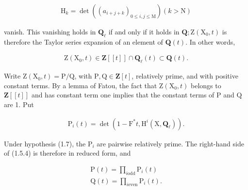 \documentclass[10pt,leqno]{article}
\begin{document}
\begin{equation*}\begin{gathered}\mathrm{H}_{k} = \operatorname{det}((a_{i+j+k})_{0\leq i,j\leq \mathrm{M}})    (k>\mathrm{N})\end{gathered}\end{equation*}

\noindent vanish. This vanishing holds in \(\mathbf{Q}_{\ell }\) if and only if it holds in \(\mathbf{Q}; \mathrm{Z}(\mathrm{X}_{0},t)\) is therefore the Taylor series expansion of an element of \(\mathbf{Q}(t)\). In other words,\par

\begin{equation*}\begin{gathered}\mathrm{Z}(\mathrm{X}_{0},t) \in  \mathbf{Z}[[t]] \cap  \mathbf{Q}_{\ell }(t) \subset  \mathbf{Q}(t).\end{gathered}\end{equation*}

\noindent Write \(\mathrm{Z}(\mathrm{X}_{0},t)=\mathrm{P}/\mathrm{Q}\), with \(\mathrm{P},\mathrm{Q}\in \mathbf{Z}[t]\), relatively prime, and with positive constant terms. By a lemma of Fatou, the fact that \(\mathrm{Z}(\mathrm{X}_{0},t)\) belongs to \(\mathbf{Z}[[t]]\) and has constant term one implies that the constant terms of \(\mathrm{P}\) and \(\mathrm{Q}\) are 1. Put\par

\begin{equation*}\begin{gathered}\mathrm{P}_{i}(t)=\operatorname{det}(1- \mathrm{F}^{*}t, \mathrm{H}^{i}(\mathrm{X},\mathbf{Q}_{\ell })).\end{gathered}\end{equation*}

\clearpage

\label{physical-6}

\noindent Under hypothesis (1.7), the \(\mathrm{P}_{i}\) are pairwise relatively prime. The right-hand side of (1.5.4) is therefore in reduced form, and\par

\begin{equation*}\begin{gathered}\mathrm{P}(t) = \prod _{i \text{odd}} \mathrm{P}_{i}(t) \\ \mathrm{Q}(t) = \prod _{i \text{even}} \mathrm{P}_{i}(t).\end{gathered}\end{equation*}
\end{document}
